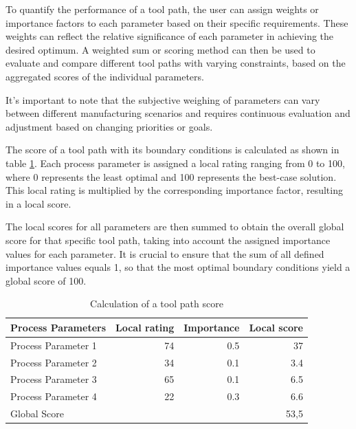 To quantify the performance of a tool path, the user can assign weights or importance factors to each parameter based on their specific requirements. These weights can reflect the relative significance of each parameter in achieving the desired optimum. A weighted sum or scoring method can then be used to evaluate and compare different tool paths with varying constraints, based on the aggregated scores of the individual parameters. %

It's important to note that the subjective weighing of parameters can vary between different manufacturing scenarios and requires continuous evaluation and adjustment based on changing priorities or goals.

The score of a tool path with its boundary conditions is calculated as shown in table \ref{weighting}. Each process parameter is assigned a local rating ranging from 0 to 100, where 0 represents the least optimal and 100 represents the best-case solution. This local rating is multiplied by the corresponding importance factor, resulting in a local score.

The local scores for all parameters are then summed to obtain the overall global score for that specific tool path, taking into account the assigned importance values for each parameter. It is crucial to ensure that the sum of all defined importance values equals 1, so that the most optimal boundary conditions yield a global score of 100.

\begin{table}[H]
	\centering
	\begin{tabular}{||l|r|r|r||}
		Process Parameters & Local rating & Importance & Local score\\
		\hline
		\hline
		\hline
		
		Process Parameter 1 & 74 & 0.5 & 37\\
		Process Parameter 2 & 34& 0.1&3.4\\
		Process Parameter 3& 65& 0.1&6.5\\
		Process Parameter 4& 22&0.3&6.6\\
		\hline
		\hline
		\hline
		Global Score& & &53,5\\
		\hline
		\hline
	\end{tabular}
	
	\caption{Calculation of a tool path score}
	\label{weighting}
\end{table}


